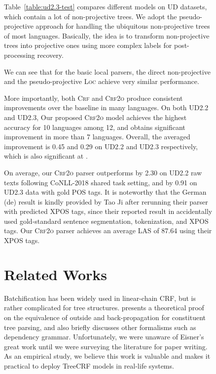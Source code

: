 \documentclass[11pt,a4paper]{article}
\begin{document}
\begin{figure}[tb]
\begin{center}
\begin{dependency}
\begin{deptext}[column sep=.16cm]
Table~\ref{table:ud2.3-test}
compares different models on UD datasets, which contain a lot of non-projective trees.
We adopt the pseudo-projective approach \cite{nivre-nilsson-2005-pseudo} for handling the ubiquitous non-projective trees of most languages. Basically, the idea is to transform non-projective trees into projective ones using more complex labels for post-processing recovery.






We can see that for the basic local parsers,
the direct non-projective  and the pseudo-projective \textsc{Loc}
achieve very similar performance.

More importantly, both \textsc{Crf} and \textsc{Crf2o} produce consistent improvements over the baseline in many languages.
On both UD2.2 and UD2.3, Our proposed \textsc{Crf2o} model achieves the highest accuracy for 10 languages among 12, and obtains significant improvement in more than 7 languages.
Overall, the averaged improvement is 0.45 and 0.29 on UD2.2 and UD2.3 respectively, which is also significant at .

On average, our \textsc{Crf2o} parser outperforms \citet{ji-etal-2019-graph} by 2.30 on UD2.2 raw texts following CoNLL-2018 shared task setting, and \citet{zhang-etal-2019-empirical} by 0.91 on UD2.3 data with gold POS tags.
It is noteworthy that the German (de) result is kindly provided by Tao Ji after rerunning their parser with predicted XPOS tags, since their reported result in \citet{ji-etal-2019-graph} accidentally used gold-standard sentence segmentation, tokenization, and XPOS tags.
Our \textsc{Crf2o} parser achieves an average LAS of 87.64 using their XPOS tags.









%
 
 \section{Related Works}
\label{section:relwork}



Batchification has been widely used in linear-chain CRF, but is rather complicated for tree structures.
\citet{eisner-2016-inside} presents a theoretical proof on the equivalence of outside and back-propagation for constituent tree parsing, and also briefly discusses other formalisms such as dependency grammar.
Unfortunately, we were unaware of Eisner's great work until we were surveying the literature for paper writing.
As an empirical study, we believe this work is valuable and makes it practical to deploy TreeCRF models in real-life systems.


\end{deptext}
\end{dependency}
\end{center}
\end{figure}
\end{document}
